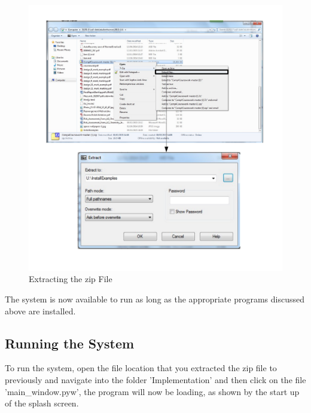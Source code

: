 \begin{figure}[H]
    \includegraphics[width=\textwidth]{./Manual/Images/ExtractZIP.pdf}
    \caption{Extracting the zip File} \label{fig:Extracting ZIP}
\end{figure}

The system is now available to run as long as the appropriate programs discussed above are installed.


\subsection{Running the System}

To run the system, open the file location that you extracted the zip file to previously and navigate into the folder 'Implementation' and then click on the file 'main\_window.pyw', the program will now be loading, as shown by the start up of the splash screen.

